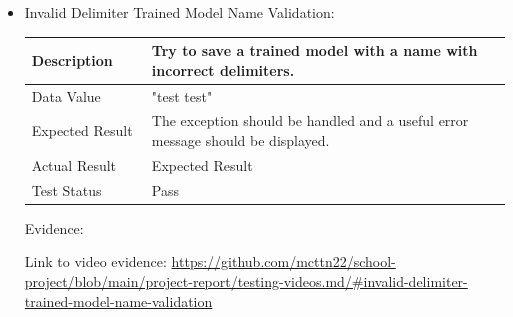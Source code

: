 \documentclass[./project-report/src/latex/project-report.tex]{subfiles}
\begin{document}
\begin{itemize}
\begin{itemize}
        \item Invalid Delimiter Trained Model Name Validation: \newline\newline
			\begin{tabular}{|p{0.25\linewidth}|p{0.75\linewidth}|}
				\hline
				Description & Try to save a trained model with a name with incorrect delimiters. \\
				\hline
				Data Value & "test  test" \\
				\hline
				Expected Result & The exception should be handled and a useful error message should be displayed. \\
				\hline
				Actual Result & Expected Result \\
				\hline
				Test Status & Pass \\
				\hline
			\end{tabular}

			\vspace{5mm}

            Evidence:
			\begin{figure}[h!]
			\centering
			\end{figure}

			\begin{sloppypar}
			Link to video evidence: \url{https://github.com/mcttn22/school-project/blob/main/project-report/testing-videos.md/#invalid-delimiter-trained-model-name-validation}
			\end{sloppypar}
    \end{itemize}
\end{itemize}
\end{document}
